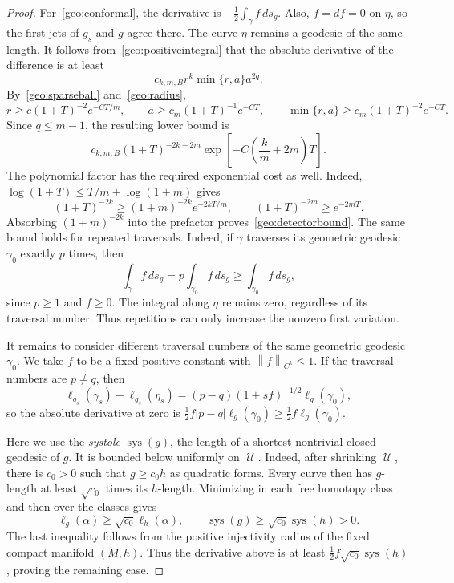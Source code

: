 \documentclass[10pt,oneside,reqno]{amsproc}
\numberwithin{equation}{section}
\theoremstyle{definition}
\theoremstyle{remark}
\newcommand{\norm}[1]{\left\|#1\right\|}
\DeclareMathOperator{\cU}{{\mathscr U}}
\renewcommand{\ge}{\geqslant}
\renewcommand{\le}{\leqslant}
\begin{document}
\begin{proof}
For~\eqref{geo:conformal}, the derivative is $-\tfrac12\int_\gamma f\,ds_g$. Also, $f=df=0$ on $\eta$, so the first jets of $g_s$ and $g$ agree there. The curve $\eta$ remains a geodesic of the same length. It follows from~\eqref{geo:positiveintegral} that the absolute derivative of the difference is at least
\[
 c_{k,m,B}r^k\min\{r,a\}a^{2q}.
\]
By~\eqref{geo:sparseball} and~\eqref{geo:radius},
\[
 r\ge c(1+T)^{-2}e^{-CT/m},\qquad a\ge c_m(1+T)^{-1}e^{-CT},\qquad \min\{r,a\}\ge c_m(1+T)^{-2}e^{-CT}.
\]
Since $q\le m-1$, the resulting lower bound is
\[
 c_{k,m,B}(1+T)^{-2k-2m}\exp\left[-C\left(\frac{k}{m}+2m\right)T\right].
\]
The polynomial factor has the required exponential cost as well. Indeed, $\log(1+T)\le T/m+\log(1+m)$ gives
\[
 (1+T)^{-2k}\ge(1+m)^{-2k}e^{-2kT/m},\qquad (1+T)^{-2m}\ge e^{-2mT}.
\]
Absorbing $(1+m)^{-2k}$ into the prefactor proves~\eqref{geo:detectorbound}. The same bound holds for repeated traversals. Indeed, if $\gamma$ traverses its geometric geodesic $\gamma_0$ exactly $p$ times, then
\[
 \int_\gamma f\,ds_g=p\int_{\gamma_0}f\,ds_g\ge\int_{\gamma_0}f\,ds_g,
\]
since $p\ge1$ and $f\ge0$. The integral along $\eta$ remains zero, regardless of its traversal number. Thus repetitions can only increase the nonzero first variation.

It remains to consider different traversal numbers of the same geometric geodesic $\gamma_0$. We take $f$ to be a fixed positive constant with $\norm{f}_{C^k}\le1$. If the traversal numbers are $p\ne q$, then
\[
 \ell_{g_s}(\gamma_s)-\ell_{g_s}(\eta_s)=(p-q)(1+sf)^{-1/2}\ell_g(\gamma_0),
\]
so the absolute derivative at zero is $\tfrac12 f|p-q|\ell_g(\gamma_0)\ge\tfrac12 f\ell_g(\gamma_0)$.

Here we use the \emph{systole} $\operatorname{sys}(g)$, the length of a shortest nontrivial closed geodesic of $g$. It is bounded below uniformly on $\cU$. Indeed, after shrinking $\cU$, there is $c_0>0$ such that $g\ge c_0h$ as quadratic forms. Every curve then has $g$-length at least $\sqrt{c_0}$ times its $h$-length. Minimizing in each free homotopy class and then over the classes gives
\begin{equation}
 \ell_g(\alpha)\ge\sqrt{c_0}\ell_h(\alpha),\qquad
 \operatorname{sys}(g)\ge\sqrt{c_0}\operatorname{sys}(h)>0.
 \label{geo:systole}
\end{equation}
The last inequality follows from the positive injectivity radius of the fixed compact manifold $(M,h)$. Thus the derivative above is at least $\tfrac12 f\sqrt{c_0}\operatorname{sys}(h)$, proving the remaining case.
\end{proof}
\end{document}
